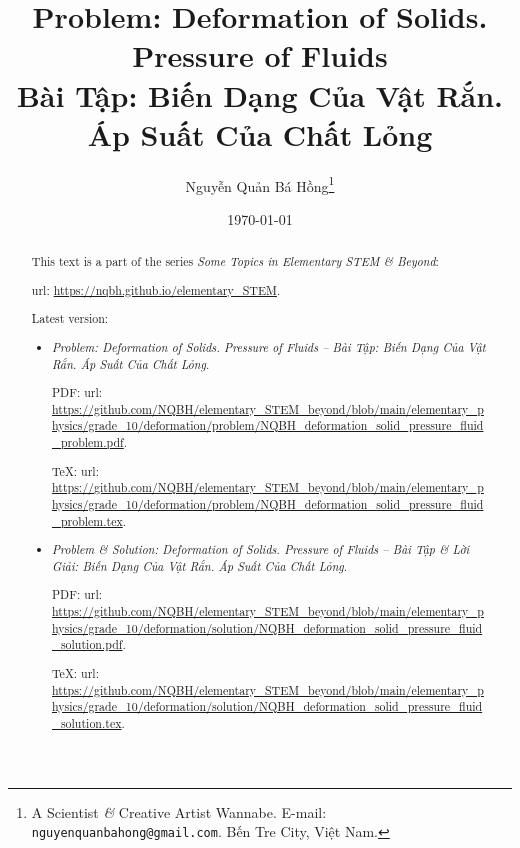 \documentclass{article}
\title{Problem: Deformation of Solids. Pressure of Fluids\\Bài Tập: Biến Dạng Của Vật Rắn. Áp Suất Của Chất Lỏng}
\author{Nguyễn Quản Bá Hồng\footnote{A Scientist {\it\&} Creative Artist Wannabe. E-mail: {\tt nguyenquanbahong@gmail.com}. Bến Tre City, Việt Nam.}}
\date{\today}
\begin{document}
\maketitle
\begin{abstract}
	This text is a part of the series {\it Some Topics in Elementary STEM \& Beyond}:
	
	{\sc url}: \url{https://nqbh.github.io/elementary_STEM}.
	
	Latest version:
	\begin{itemize}
		\item {\it Problem: Deformation of Solids. Pressure of Fluids -- Bài Tập: Biến Dạng Của Vật Rắn. Áp Suất Của Chất Lỏng}.
		
		PDF: {\sc url}: \url{https://github.com/NQBH/elementary_STEM_beyond/blob/main/elementary_physics/grade_10/deformation/problem/NQBH_deformation_solid_pressure_fluid_problem.pdf}.
		
		\TeX: {\sc url}: \url{https://github.com/NQBH/elementary_STEM_beyond/blob/main/elementary_physics/grade_10/deformation/problem/NQBH_deformation_solid_pressure_fluid_problem.tex}.
		\item {\it Problem \& Solution: Deformation of Solids. Pressure of Fluids -- Bài Tập \& Lời Giải: Biến Dạng Của Vật Rắn. Áp Suất Của Chất Lỏng}.
		
		PDF: {\sc url}: \url{https://github.com/NQBH/elementary_STEM_beyond/blob/main/elementary_physics/grade_10/deformation/solution/NQBH_deformation_solid_pressure_fluid_solution.pdf}.
		
		\TeX: {\sc url}: \url{https://github.com/NQBH/elementary_STEM_beyond/blob/main/elementary_physics/grade_10/deformation/solution/NQBH_deformation_solid_pressure_fluid_solution.tex}.
	\end{itemize}
\end{abstract}
\tableofcontents

\end{document}
